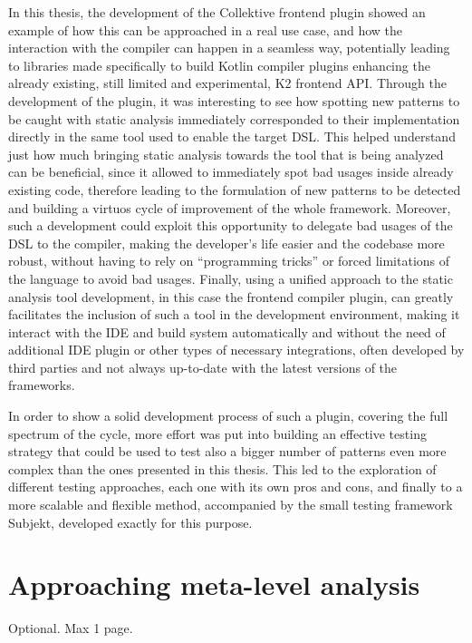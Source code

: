 \documentclass[12pt,a4paper,openright,twoside]{book}
\begin{document}
In this thesis, the development of the Collektive frontend plugin showed an
example of how this can be approached in a real use case, and how the
interaction with the compiler can happen in a seamless way, potentially leading
to libraries made specifically to build Kotlin compiler plugins enhancing the
already existing, still limited and experimental, K2 frontend API.
%
Through the development of the plugin, it was interesting to see how spotting
new patterns to be caught with static analysis immediately corresponded to their
implementation directly in the same tool used to enable the target \ac{DSL}.
This helped understand just how much bringing static analysis towards the tool
that is being analyzed can be beneficial, since it allowed to immediately spot
bad usages inside already existing code, therefore leading to the formulation of
new patterns to be detected and building a virtuos cycle of improvement of the
whole framework. Moreover, such a development could exploit this opportunity to
delegate bad usages of the \ac{DSL} to the compiler, making the developer's life
easier and the codebase more robust, without having to rely on ``programming
tricks'' or forced limitations of the language to avoid bad usages.
%
Finally, using a unified approach to the static analysis tool development, in 
this case the frontend compiler plugin, can greatly facilitates the inclusion 
of such a tool in the development environment, making it interact with the 
\ac{IDE} and build system automatically and without the need of additional
\ac{IDE} plugin or other types of necessary integrations, often developed by
third parties and not always up-to-date with the latest versions of the
frameworks.

In order to show a solid development process of such a plugin, covering the
full spectrum of the cycle, more effort was put into building an effective
testing strategy that could be used to test also a bigger number of patterns
even more complex than the ones presented in this thesis. This led to the 
exploration of different testing approaches, each one with its own pros and
cons, and finally to a more scalable and flexible method, accompanied by
the small testing framework Subjekt, developed exactly for this purpose.

\section{Approaching meta-level analysis}


\backmatter

\nocite{*} %




\begin{acknowledgements} %
Optional. Max 1 page.
\end{acknowledgements}
\end{document}
